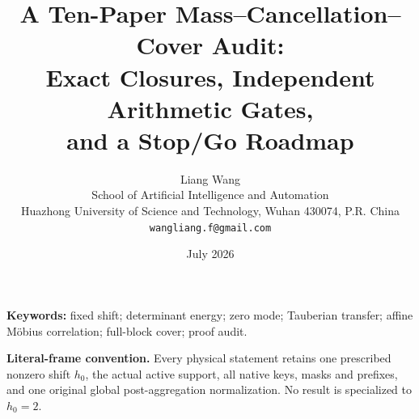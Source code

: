 \documentclass[11pt]{article}
\title{\textbf{A Ten-Paper Mass--Cancellation--Cover Audit:}\\
Exact Closures, Independent Arithmetic Gates,\\
and a Stop/Go Roadmap}
\author{Liang Wang\\
School of Artificial Intelligence and Automation\\
Huazhong University of Science and Technology, Wuhan 430074, P.R. China\\
\texttt{wangliang.f@gmail.com}}
\date{July 2026}
\theoremstyle{definition}
\theoremstyle{remark}
\begin{document}
\maketitle



\noindent\textbf{Keywords:}
fixed shift; determinant energy; zero mode; Tauberian transfer;
affine M\"obius correlation; full-block cover; proof audit.

\medskip
\noindent\textbf{Literal-frame convention.}
Every physical statement retains one prescribed nonzero shift
\(h_0\), the actual active support, all native keys, masks and
prefixes, and one original global post-aggregation normalization.
No result is specialized to \(h_0=2\).










\begingroup
\footnotesize
\raggedright


\endgroup
\end{document}
